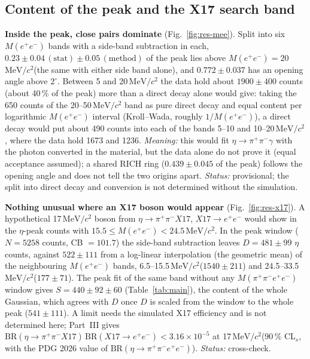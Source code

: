 \documentclass[11pt,a4paper]{article}
\newcommand{\ee}{\ensuremath{e^{+}e^{-}}\xspace}
\newcommand{\pipi}{\ensuremath{\pi^{+}\pi^{-}}\xspace}
\newcommand{\ppee}{\ensuremath{\pi^{+}\pi^{-}e^{+}e^{-}}\xspace}
\newcommand{\Mfour}{\ensuremath{M(\pi^{+}\pi^{-}e^{+}e^{-})}\xspace}
\newcommand{\Mee}{\ensuremath{M(e^{+}e^{-})}\xspace}
\newcommand{\MeVcc}{\ensuremath{\mathrm{MeV}/c^{2}}\xspace}
\begin{document}
\subsection{Content of the peak and the X17 search band}
\label{sec:mee}
\textbf{Inside the peak, close pairs dominate} (Fig.~\ref{fig:res-mee}). Split into six \Mee bands with a side-band subtraction in each,
$0.23\pm0.04\,(\mathrm{stat})\pm0.05\,(\mathrm{method})$ of the peak lies above $\Mee=20$\,\MeVcc (the same with either side band alone),
and $0.772\pm0.037$ has an opening angle above $2^\circ$. Between 5 and 20\,\MeVcc the data hold about $1900\pm400$ counts (about 40\,\% of
the peak) more than a direct decay alone would give: taking the 650 counts of the 20--50\,\MeVcc band as pure direct decay and equal
content per logarithmic \Mee interval (Kroll--Wada, roughly $1/\Mee$), a direct decay would put about 490 counts into each of the bands
5--10 and 10--20\,\MeVcc, where the data hold 1673 and 1236. \emph{Meaning:} this would fit $\eta\to\pipi\gamma$ with the photon converted
in the material, but the data alone do not prove it (equal acceptance assumed); a shared RICH ring ($0.439\pm0.045$ of the peak) follows
the opening angle and does not tell the two origins apart. \emph{Status:} provisional; the split into direct decay and conversion is not
determined without the simulation.

\textbf{Nothing unusual where an X17 boson would appear} (Fig.~\ref{fig:res-x17}). A hypothetical 17\,\MeVcc boson from $\eta\to\pipi X17$,
$X17\to\ee$ would show in the $\eta$-peak counts with $15.5\le\Mee<24.5$\,\MeVcc. In the peak window ($N=5258$ counts, CB $=101.7$) the
side-band subtraction leaves $D=481\pm99$ $\eta$ counts, against $522\pm111$ from a log-linear interpolation (the geometric mean) of the
neighbouring \Mee bands, 6.5--15.5\,\MeVcc ($1540\pm211$) and 24.5--33.5\,\MeVcc ($177\pm71$). The peak fit of the same band without any
\Mfour window gives $S=440\pm92\pm60$ (Table~\ref{tab:main}), the content of the whole Gaussian, which agrees with $D$ once $D$ is scaled
from the window to the whole peak ($541\pm111$). A limit needs the simulated X17 efficiency and is not determined here; Part~III gives
$\mathrm{BR}(\eta\to\pipi X17)\,\mathrm{BR}(X17\to\ee)<3.16\times10^{-5}$ at 17\,\MeVcc (90\,\% CL$_s$, with the PDG 2026 value of
$\mathrm{BR}(\eta\to\ppee)$). \emph{Status:} cross-check.


\end{document}
